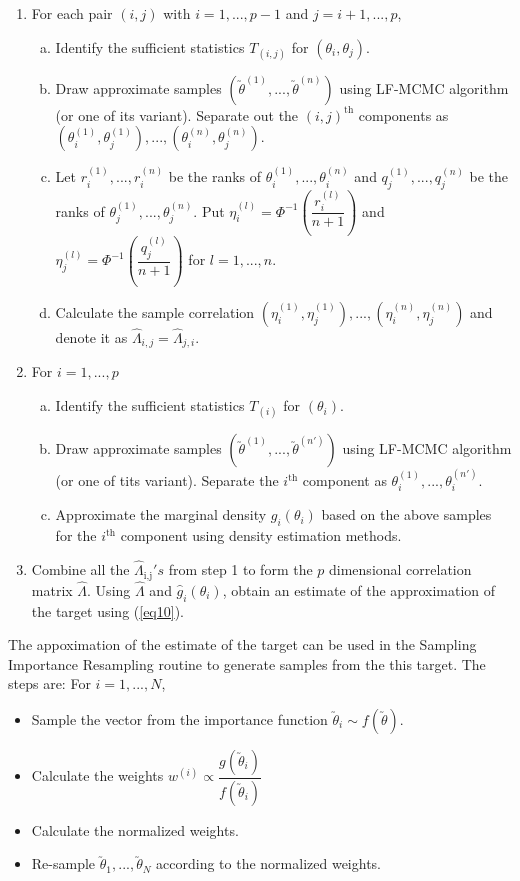 \begin{multicols}{2}
\begin{enumerate}
\item For each pair $(i,j)$ with $i=1,..., p-1$ and $j=i+1,..., p$,
\begin{enumerate}[(a)]
\item Identify the sufficient statistics $T_{(i,j)}$ for $(\theta_i,\theta_j)$.
\item Draw approximate samples $(\utilde{\theta}^{(1)},..., \utilde{\theta}^{(n)})$ using LF-MCMC algorithm (or one of its variant). Separate out the $(i,j)^{\text{th}}$ components as $(\theta_i^{(1)},\theta_j^{(1)}),..., (\theta_i^{(n)},\theta_j^{(n)})$.
\item Let $r_i^{(1)},..., r_i^{(n)}$ be the ranks of $\theta_i^{(1)},..., \theta_i^{(n)}$ and $q_j^{(1)},..., q_j^{(n)}$ be the ranks of $\theta_j^{(1)},..., \theta_j^{(n)}$. Put $\eta_i^{(l)}=\Phi^{-1}\left(\dfrac{r_i^{(l)}}{n+1}\right)$ and $\eta_j^{(l)}=\Phi^{-1}\left(\dfrac{q_j^{(l)}}{n+1}\right)$ for $l=1,..., n$.
\item Calculate the sample correlation $(\eta_i^{(1)}, \eta_j^{(1)}),..., (\eta_i^{(n)}, \eta_j^{(n)})$ and denote it as $\hat{\Lambda}_{i,j}=\hat{\Lambda}_{j,i}$.
\end{enumerate}
\item For $i=1,..., p$
\begin{enumerate}[(a)]
\item Identify the sufficient statistics $T_{(i)}$ for $(\theta_i)$.
\item Draw approximate samples $(\utilde{\theta}^{(1)},..., \utilde{\theta}^{(n')})$ using LF-MCMC algorithm (or one of tits variant). Separate the $i^{\text{th}}$ component as $\theta_i^{(1)},..., \theta_i^{(n')}$.
\item Approximate the marginal density $g_i(\theta_i)$ based on the above samples for the  $i^{\text{th}}$ component using density estimation methods. 
\end{enumerate}
\item Combine all the $\hat{\Lambda}_{\text{i,j}}'s$ from step 1 to form the $p$ dimensional correlation matrix $\hat{\Lambda}$. Using $\hat{\Lambda}$ and $\hat{g}_i(\theta_i)$, obtain an estimate of the approximation of the target using (\ref{eq10}). 
\end{enumerate}

The appoximation of the estimate of the target can be used in the Sampling Importance Resampling routine to generate samples from the this target. The steps are:
For $i=1,..., N$,
\begin{itemize}
\item Sample the vector from the importance function $\utilde{\theta}_i\sim f(\utilde{\theta})$.
\item Calculate the weights $w^{(i)}\propto \dfrac{g(\utilde{\theta}_i)}{f(\utilde{\theta}_i)}$
\item Calculate the normalized weights.
\item Re-sample $\utilde{\theta}_1,..., \utilde{\theta}_N$ according to the normalized weights. 
\end{itemize}


\end{multicols}
